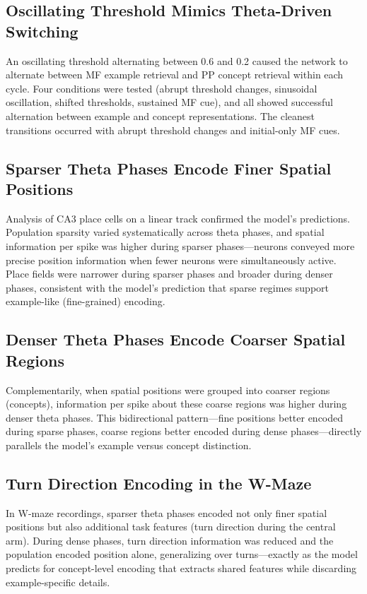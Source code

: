 \documentclass[11pt]{article}
\begin{document}
\subsection{Oscillating Threshold Mimics Theta-Driven Switching}

An oscillating threshold alternating between 0.6 and 0.2 caused the network to alternate between MF example retrieval and PP concept retrieval within each cycle. Four conditions were tested (abrupt threshold changes, sinusoidal oscillation, shifted thresholds, sustained MF cue), and all showed successful alternation between example and concept representations. The cleanest transitions occurred with abrupt threshold changes and initial-only MF cues.

\subsection{Sparser Theta Phases Encode Finer Spatial Positions}

Analysis of CA3 place cells on a linear track confirmed the model's predictions. Population sparsity varied systematically across theta phases, and spatial information per spike was higher during sparser phases---neurons conveyed more precise position information when fewer neurons were simultaneously active. Place fields were narrower during sparser phases and broader during denser phases, consistent with the model's prediction that sparse regimes support example-like (fine-grained) encoding.

\subsection{Denser Theta Phases Encode Coarser Spatial Regions}

Complementarily, when spatial positions were grouped into coarser regions (concepts), information per spike about these coarse regions was higher during denser theta phases. This bidirectional pattern---fine positions better encoded during sparse phases, coarse regions better encoded during dense phases---directly parallels the model's example versus concept distinction.

\subsection{Turn Direction Encoding in the W-Maze}

In W-maze recordings, sparser theta phases encoded not only finer spatial positions but also additional task features (turn direction during the central arm). During dense phases, turn direction information was reduced and the population encoded position alone, generalizing over turns---exactly as the model predicts for concept-level encoding that extracts shared features while discarding example-specific details.
\end{document}
